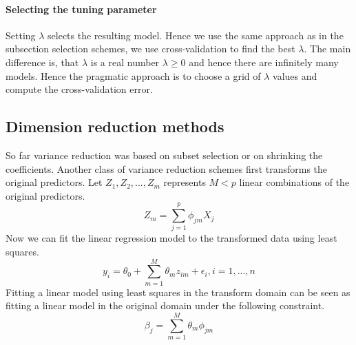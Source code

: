 \documentclass[../document.tex]{subfiles}
\begin{document}
	\paragraph{Selecting the tuning parameter}
	Setting \(\lambda\) selects the resulting model. Hence we use the same approach as in the subsection selection schemes, we use cross-validation to find the best \(\lambda\). The main difference is, that \(\lambda\) is a real number \(\lambda \geq0\) and hence there are infinitely many models. Hence the pragmatic approach is to choose a grid of \(\lambda\) values and compute the cross-validation error.

	\sectionbreak
	\subsection{Dimension reduction methods}
	So far variance reduction was based on subset selection or on shrinking the coefficients. Another class of variance reduction schemes first transforms the original predictors. Let \(Z_{1},Z_{2},...,Z_{m}\) represents \(M<p\) linear combinations of the original predictors.
	\begin{equation}
		Z_{m}=\sum_{j=1}^{p}\phi_{jm}X_{j}
	\end{equation}
	Now we can fit the linear regression model to the transformed data using least squares.
	\begin{equation}
		y_{i}=\theta_{0}+\sum_{m=1}^{M}\theta_{m}z_{im}+\epsilon_{i}, i=1,...,n
	\end{equation}
	Fitting a linear model using least squares in the transform domain can be seen as fitting a linear model in the original domain under the following constraint.
	\begin{equation}
		\beta_{j}=\sum_{m=1}^{M}\theta_{m}\phi_{jm}
	\end{equation}
\end{document}
